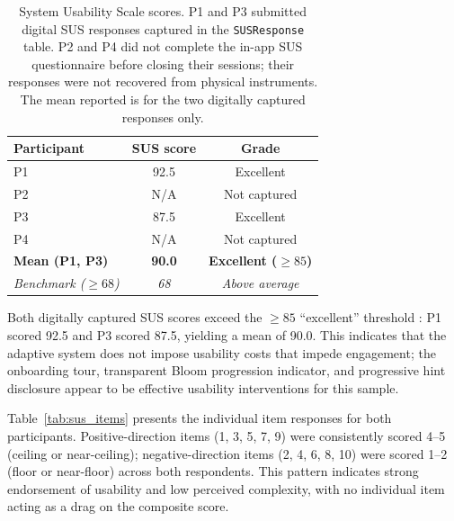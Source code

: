 \begin{table}[H]
\centering
\caption{System Usability Scale scores. P1 and P3 submitted digital SUS
responses captured in the \texttt{SUSResponse} table. P2 and P4 did not
complete the in-app SUS questionnaire before closing their sessions; their
responses were not recovered from physical instruments. The mean reported is
for the two digitally captured responses only.}
\label{tab:sus}
\renewcommand{\arraystretch}{1.25}
\begin{tabular}{lcc}
\toprule
\textbf{Participant} & \textbf{SUS score} & \textbf{Grade} \\
\midrule
P1 & 92.5 & Excellent \\
P2 & N/A & Not captured \\
P3 & 87.5 & Excellent \\
P4 & N/A & Not captured \\
\midrule
\textbf{Mean (P1, P3)} & \textbf{90.0} & \textbf{Excellent ($\geq 85$)} \\
\textit{Benchmark ($\geq 68$)} & \textit{68} & \textit{Above average} \\
\bottomrule
\end{tabular}
\end{table}

Both digitally captured SUS scores exceed the $\geq 85$ ``excellent''
threshold \parencite{bangor2008}: P1 scored 92.5 and P3 scored 87.5,
yielding a mean of 90.0. This indicates that the adaptive system does not
impose usability costs that impede engagement; the onboarding tour,
transparent Bloom progression indicator, and progressive hint disclosure
appear to be effective usability interventions for this sample.

Table~\ref{tab:sus_items} presents the individual item responses for both
participants. Positive-direction items (1, 3, 5, 7, 9) were consistently
scored 4--5 (ceiling or near-ceiling); negative-direction items (2, 4, 6,
8, 10) were scored 1--2 (floor or near-floor) across both respondents.
This pattern indicates strong endorsement of usability and low perceived
complexity, with no individual item acting as a drag on the composite score.

